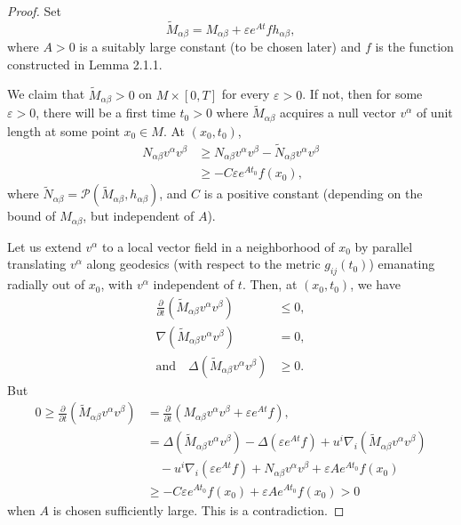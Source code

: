 \begin{proof}
Set
$$
\tilde{M}_{\alpha\beta} =M_{\alpha\beta}+\varepsilon e^{At}f
h_{\alpha\beta},
$$
where $A>0$ is a suitably large constant (to be chosen later) and
$f$ is the function constructed in Lemma 2.1.1.

We claim that $\tilde{M}_{\alpha\beta}>0$ on $M\times[0,T]$ for
every $\varepsilon>0$. If not, then for some $\varepsilon>0$,
there will be a first time $t_0>0$ where $\tilde{M}_{\alpha\beta}$
acquires a null vector $v^\alpha$ of unit length at some point
$x_0\in M$. At $(x_0,t_0)$,
\begin{align*}
N_{\alpha\beta}v^\alpha v^\beta & \geq N_{\alpha\beta}v^\alpha
v^\beta
-\tilde{N}_{\alpha\beta}v^\alpha v^\beta\\
& \ge -C\varepsilon e^{At_0}f(x_0),
\end{align*}
where
$\tilde{N}_{\alpha\beta}=\mathcal{P}(\tilde{M}_{\alpha\beta},
h_{\alpha\beta})$, and $C$ is a positive constant (depending on
the bound of $M_{\alpha\beta}$, but independent of $A$).

Let us extend $v^\alpha$ to a local vector field in a neighborhood
of $x_0$ by parallel translating $v^{\alpha}$ along geodesics
(with respect to the metric $g_{ij}(t_0)$) emanating radially out
of $x_0$, with $v^{\alpha}$ independent of $t$. Then, at
$(x_0,t_0)$, we have
\begin{align*}
\frac{\partial}{\partial t}(\tilde{M}_{\alpha\beta}v^\alpha
v^\beta)&  \le 0 ,\\
\nabla (\tilde{M}_{\alpha\beta}v^\alpha v^\beta)&  = 0, \\
 \text{and} \quad \Delta(\tilde{M}_{\alpha\beta}v^\alpha
v^\beta)&  \ge 0.
\end{align*}
But
\begin{align*}
0\ge\frac{\partial}{\partial t}(\tilde{M}_{\alpha\beta}v^\alpha
v^\beta) &  = \frac{\partial}{\partial t}(M_{\alpha\beta}v^\alpha
v^\beta+\varepsilon e^{At}f),\\
&  = \Delta(\tilde{M}_{\alpha\beta}v^\alpha
v^\beta)-\Delta(\varepsilon
e^{At}f)+u^i\nabla_i(\tilde{M}_{\alpha\beta}v^\alpha
v^\beta)\\
&\quad -u^i\nabla_i(\varepsilon e^{At}f)+N_{\alpha\beta}v^\alpha
v^\beta+\varepsilon A e^{At_0}f(x_0)\\
&  \ge -C\varepsilon e^{At_0}f(x_0)+\varepsilon A e^{At_0}f(x_0)>0
\end{align*}
when $A$ is chosen sufficiently large. This is a contradiction.
\end{proof}

